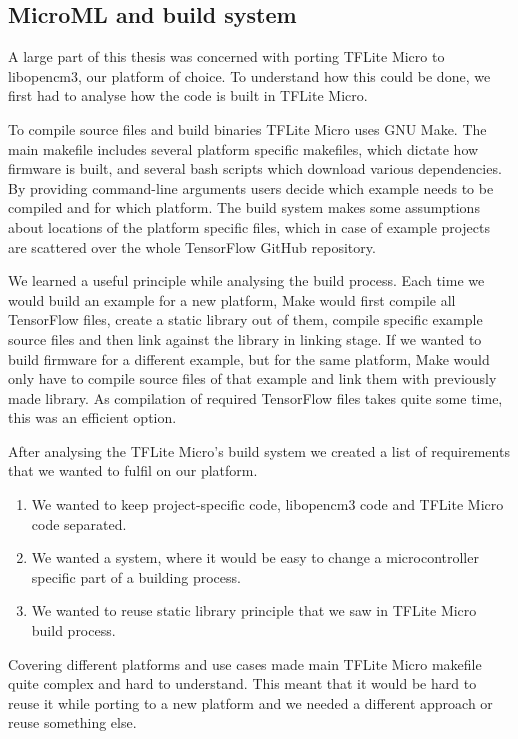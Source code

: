 \subsection{ MicroML and build system} \label{build_system_label}

A large part of this thesis was concerned with porting TFLite Micro to libopencm3, our platform of choice.
To understand how this could be done, we first had to analyse how the code is built in TFLite Micro.

To compile source files and build binaries TFLite Micro uses GNU Make.
The main makefile includes several platform specific makefiles, which dictate how firmware is built, and several bash scripts which download various dependencies.
By providing command-line arguments users decide which example needs to be compiled and for which platform.
The build system makes some assumptions about locations of the platform specific files, which in case of example projects are scattered over the whole TensorFlow GitHub repository.

We learned a useful principle while analysing the build process. 
Each time we would build an example for a new platform, Make would first compile all TensorFlow files, create a static library out of them, compile specific example source files and then link against the library in linking stage.
If we wanted to build firmware for a different example, but for the same platform, Make would only have to compile source files of that example and link them with previously made library.
As compilation of required TensorFlow files takes quite some time, this was an efficient option.

After analysing the TFLite Micro's build system we created a list of requirements that we wanted to fulfil on our platform.

\begin{enumerate}
    \item We wanted to keep project-specific code, libopencm3 code and TFLite Micro code separated.
    \item We wanted a system, where it would be easy to change a microcontroller specific part of a building process.
    \item We wanted to reuse static library principle that we saw in TFLite Micro build process.
\end{enumerate}

Covering different platforms and use cases made main TFLite Micro makefile quite complex and hard to understand.
This meant that it would be hard to reuse it while porting to a new platform and we needed a different approach or reuse something else.

